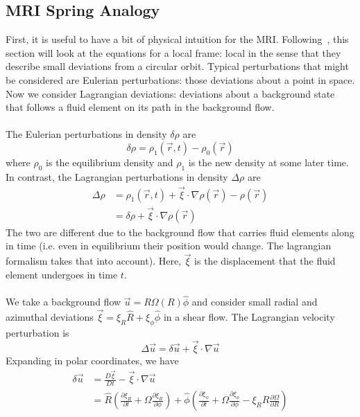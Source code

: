 \subsection{MRI Spring Analogy} \label{sec:mrispring}
First, it is useful to have a bit of physical intuition for the MRI. Following~\cite{Kunz2016HW2,Kunz2016HW3}, this section will look at the equations for a local frame: local in the sense that they describe small deviations from a circular orbit. Typical perturbations that might be considered are Eulerian perturbations: those deviations about a point in space. Now we consider Lagrangian deviations: deviations about a background state that follows a fluid element on its path in the background flow. \\
\\
The Eulerian perturbations in density $\delta\rho$ are
\begin{equation*}
\delta\rho=\rho_1(\vec r,t)-\rho_0(\vec r)
\end{equation*}
where $\rho_0$ is the equilibrium density and $\rho_1$ is the new density at some later time. In contrast, the Lagrangian perturbations in density $\Delta\rho$ are
\begin{align*}
\Delta\rho&=\rho_1(\vec r,t)+\vec\xi\cdot\nabla\rho(\vec r)-\rho(\vec r)\\
&=\delta\rho+\vec\xi\cdot\nabla\rho(\vec r)
\end{align*}
The two are different due to the background flow that carries fluid elements along in time (i.e. even in equilibrium their position would change. The lagrangian formalism takes that into account). Here, $\vec\xi$ is the displacement that the fluid element undergoes in time $t$. \\
\\
We take a background flow $\vec u=R\Omega(R)\hat\phi$ and consider small radial and azimuthal deviations $\vec\xi=\xi_R\hat R+\xi_\phi\hat\phi$ in a shear flow. The Lagrangian velocity perturbation is
\begin{equation*}
\Delta\vec u=\delta\vec u+\vec\xi\cdot\nabla\vec u
\end{equation*}
Expanding in polar coordinates, we have
\begin{align}
\delta\vec u&=\frac{D\vec\xi}{Dt}-\vec\xi\cdot\nabla\vec u\nonumber\\
&=\hat R\left(\frac{\partial\xi_R}{\partial t}+\Omega\frac{\partial\xi_R}{\partial\phi}\right)+\hat\phi\left(\frac{\partial\xi_\phi}{\partial t}+\Omega\frac{\partial\xi_\phi}{\partial\phi}-\xi_RR\frac{\partial\Omega}{\partial R}\right) \label{eq:du1}
\end{align}
